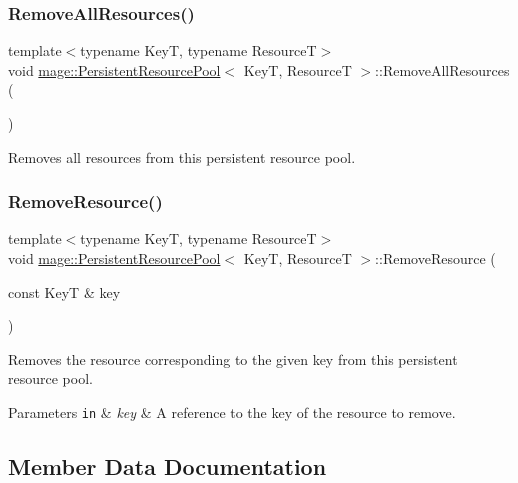 \subsubsection{\texorpdfstring{Remove\+All\+Resources()}{RemoveAllResources()}}
{\footnotesize\ttfamily template$<$typename KeyT, typename ResourceT$>$ \\
void \hyperlink{classmage_1_1_persistent_resource_pool}{mage\+::\+Persistent\+Resource\+Pool}$<$ KeyT, ResourceT $>$\+::Remove\+All\+Resources (\begin{DoxyParamCaption}{ }\end{DoxyParamCaption})}

Removes all resources from this persistent resource pool. \hypertarget{classmage_1_1_persistent_resource_pool_ab9f233a5510cf9dc35454b7f3b8b415f}{}\label{classmage_1_1_persistent_resource_pool_ab9f233a5510cf9dc35454b7f3b8b415f} 
\subsubsection{\texorpdfstring{Remove\+Resource()}{RemoveResource()}}
{\footnotesize\ttfamily template$<$typename KeyT, typename ResourceT$>$ \\
void \hyperlink{classmage_1_1_persistent_resource_pool}{mage\+::\+Persistent\+Resource\+Pool}$<$ KeyT, ResourceT $>$\+::Remove\+Resource (\begin{DoxyParamCaption}\item[{const KeyT \&}]{key }\end{DoxyParamCaption})}

Removes the resource corresponding to the given key from this persistent resource pool.


\begin{DoxyParams}[1]{Parameters}
\mbox{\tt in}  & {\em key} & A reference to the key of the resource to remove. \\
\hline
\end{DoxyParams}


\subsection{Member Data Documentation}
\hypertarget{classmage_1_1_persistent_resource_pool_a012bb02caf20ff4bcfcfe60331d37310}{}\label{classmage_1_1_persistent_resource_pool_a012bb02caf20ff4bcfcfe60331d37310} 
